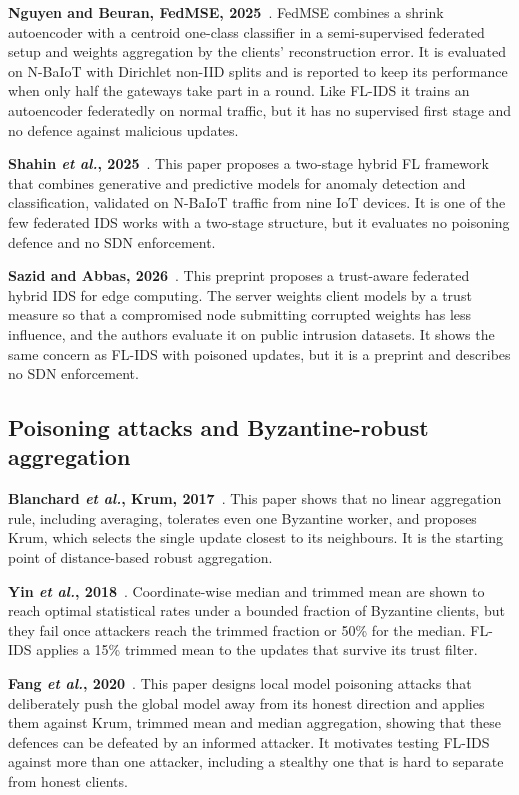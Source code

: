 \textbf{Nguyen and Beuran, FedMSE, 2025}~\cite{nguyen2025fedmse}. FedMSE combines a shrink autoencoder with a centroid one-class classifier in a semi-supervised federated setup and weights aggregation by the clients' reconstruction error. It is evaluated on N-BaIoT with Dirichlet non-IID splits and is reported to keep its performance when only half the gateways take part in a round. Like FL-IDS it trains an autoencoder federatedly on normal traffic, but it has no supervised first stage and no defence against malicious updates.

\textbf{Shahin \emph{et al.}, 2025}~\cite{shahin2025}. This paper proposes a two-stage hybrid FL framework that combines generative and predictive models for anomaly detection and classification, validated on N-BaIoT traffic from nine IoT devices. It is one of the few federated IDS works with a two-stage structure, but it evaluates no poisoning defence and no SDN enforcement.

\textbf{Sazid and Abbas, 2026}~\cite{sazid2026}. This preprint proposes a trust-aware federated hybrid IDS for edge computing. The server weights client models by a trust measure so that a compromised node submitting corrupted weights has less influence, and the authors evaluate it on public intrusion datasets. It shows the same concern as FL-IDS with poisoned updates, but it is a preprint and describes no SDN enforcement.

\subsection{Poisoning attacks and Byzantine-robust aggregation}

\textbf{Blanchard \emph{et al.}, Krum, 2017}~\cite{blanchard2017}. This paper shows that no linear aggregation rule, including averaging, tolerates even one Byzantine worker, and proposes Krum, which selects the single update closest to its neighbours. It is the starting point of distance-based robust aggregation.

\textbf{Yin \emph{et al.}, 2018}~\cite{yin2018trimmed}. Coordinate-wise median and trimmed mean are shown to reach optimal statistical rates under a bounded fraction of Byzantine clients, but they fail once attackers reach the trimmed fraction or 50\% for the median. FL-IDS applies a 15\% trimmed mean to the updates that survive its trust filter.

\textbf{Fang \emph{et al.}, 2020}~\cite{fang2020}. This paper designs local model poisoning attacks that deliberately push the global model away from its honest direction and applies them against Krum, trimmed mean and median aggregation, showing that these defences can be defeated by an informed attacker. It motivates testing FL-IDS against more than one attacker, including a stealthy one that is hard to separate from honest clients.

